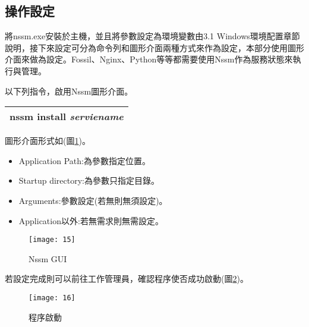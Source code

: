 \subsection{操作設定}
\par
\renewcommand{\baselinestretch}{1} %
\twelve \qquad 將nssm.exe安裝於主機，並且將參數設定為環境變數由3.1 Windows環境配置章節說明，接下來設定可分為命令列和圖形介面兩種方式來作為設定，本部分使用圖形介面來做為設定。Fossil、Nginx、Python等等都需要使用Nssm作為服務狀態來執行與管理。
\par
\renewcommand{\baselinestretch}{1} %
\twelve \hspace{0.5em} 以下列指令，啟用Nssm圖形介面。
\par
\begin{center}
\begin{tabular}{||p{15cm}|} %
\hline
\textbf{nssm install} \emph{serviename} 
\\
\hline
\end{tabular}
\end{center}
\par
\renewcommand{\baselinestretch}{1} %
\twelve \hspace{0.5em} 圖形介面形式如(圖\ref{fig.Nssm GUI})。
\par
\begin{itemize}
	\item Application Path:為參數指定位置。
	\item Startup directory:為參數只指定目錄。
	\item Arguments:參數設定(若無則無須設定)。
	\item Application以外:若無需求則無需設定。
\end{itemize}
\par
\renewcommand{\baselinestretch}{1.7} %
\begin{figure}[hbt!]
\begin{center}
\texttt{[image: 15]}
\caption{\large Nssm GUI}\label{fig.Nssm GUI}
\end{center}
\end{figure}
\par
\renewcommand{\baselinestretch}{1} %
\twelve \hspace{0.5em} 若設定完成則可以前往工作管理員，確認程序使否成功啟動(圖\ref{fig.程序啟動})。
\par
\renewcommand{\baselinestretch}{1.7} %
\begin{figure}[hbt!]
\begin{center}
\texttt{[image: 16]}
\caption{\large 程序啟動}\label{fig.程序啟動}
\end{center}
\end{figure}
\par

